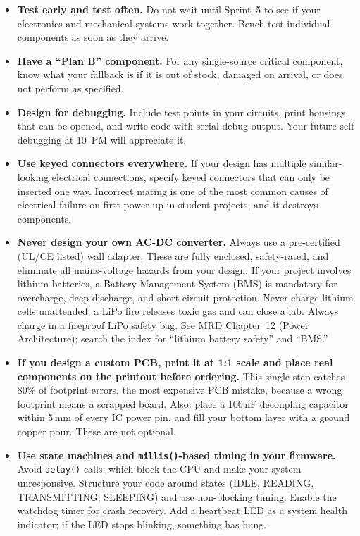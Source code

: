 \begin{itemize}[leftmargin=*, itemsep=4pt]
    \item \textbf{Test early and test often.} Do not wait until Sprint~5 to see if your electronics and mechanical systems work together. Bench-test individual components as soon as they arrive.
    \item \textbf{Have a ``Plan B'' component.} For any single-source critical component, know what your fallback is if it is out of stock, damaged on arrival, or does not perform as specified.
    \item \textbf{Design for debugging.} Include test points in your circuits, print housings that can be opened, and write code with serial debug output. Your future self debugging at 10~PM will appreciate it.
    \item \textbf{Use keyed connectors everywhere.} If your design has multiple similar-looking electrical connections, specify keyed connectors that can only be inserted one way. Incorrect mating is one of the most common causes of electrical failure on first power-up in student projects, and it destroys components.
    \item \textbf{Never design your own AC-DC converter.} Always use a pre-certified (UL/CE listed) wall adapter. These are fully enclosed, safety-rated, and eliminate all mains-voltage hazards from your design. If your project involves lithium batteries, a Battery Management System (BMS) is mandatory for overcharge, deep-discharge, and short-circuit protection. Never charge lithium cells unattended; a LiPo fire releases toxic gas and can close a lab. Always charge in a fireproof LiPo safety bag. See MRD Chapter~12 (Power Architecture); search the index for ``lithium battery safety'' and ``BMS.''
    \item \textbf{If you design a custom PCB, print it at 1:1 scale and place real components on the printout before ordering.} This single step catches 80\% of footprint errors, the most expensive PCB mistake, because a wrong footprint means a scrapped board. Also: place a 100\,nF decoupling capacitor within 5\,mm of every IC power pin, and fill your bottom layer with a ground copper pour. These are not optional.
    \item \textbf{Use state machines and \texttt{millis()}-based timing in your firmware.} Avoid \texttt{delay()} calls, which block the CPU and make your system unresponsive. Structure your code around states (IDLE, READING, TRANSMITTING, SLEEPING) and use non-blocking timing. Enable the watchdog timer for crash recovery. Add a heartbeat LED as a system health indicator; if the LED stops blinking, something has hung.
\end{itemize}


